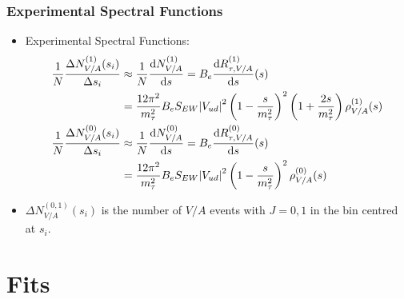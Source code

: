 \documentclass{beamer}
\begin{document}
\begin{frame}
  \frametitle{Experimental Spectral Functions}
  \begin{itemize}
  \item Experimental Spectral Functions:
    \begin{align}
      \frac{1}{N} \frac{\Delta N_{V/A}^{(1)}(s_i)}{\Delta s_i}
      &\approx \frac{1}{N} \frac{\dif N_{V/A}^{(1)}}{\dif s} = B_e \frac{\dif R_{\tau, V/A}^{(1)}}{\dif s}(s) \nonumber\\
      &= \frac{12\pi^2}{m_\tau^2} B_e S_{EW} \abs{V_{ud}}^2
        \left( 1 - \frac{s}{m_\tau^2} \right)^2\left( 1 + \frac{2s}{m_\tau^2} \right) \rho_{V/A}^{(1)}(s) \\
      \frac{1}{N} \frac{\Delta N_{V/A}^{(0)}(s_i)}{\Delta s_i}
      &\approx \frac{1}{N} \frac{\dif N_{V/A}^{(0)}}{\dif s} = B_e \frac{\dif R_{\tau, V/A}^{(0)}}{\dif s}(s) \nonumber\\
      &= \frac{12\pi^2}{m_\tau^2} B_e S_{EW} \abs{V_{ud}}^2
        \left( 1 - \frac{s}{m_\tau^2} \right)^2 \rho_{V/A}^{(0)}(s)
    \end{align}
  \item \(\Delta N_{V/A}^{(0,1)}(s_i)\) is the number of \(V/A\) events with
    \(J=0,1\) in the bin centred at \(s_i\).
  \end{itemize}
\end{frame}


\section{Fits}
\end{document}
